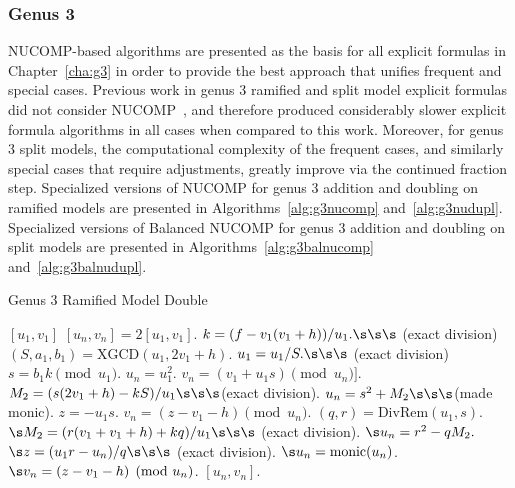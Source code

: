 \newpage


\subsubsection{Genus 3}
NUCOMP-based algorithms are presented as the basis for all explicit formulas in
Chapter~\ref{cha:g3} in order to provide the best approach that unifies frequent
and special cases. Previous work in genus 3 ramified and split model explicit
formulas did not consider
NUCOMP~\cite{fan_g3_2006,rad2019jacobian,Sutherland_g3_2019}, and therefore
produced considerably slower explicit formula algorithms in all cases when
compared to this work. Moreover, for genus 3 split models, the computational
complexity of the frequent cases, and similarly special cases that require
adjustments, greatly improve via the continued fraction step. Specialized
versions of NUCOMP for genus 3 addition and doubling on ramified models are
presented in Algorithms~\ref{alg:g3nucomp} and~\ref{alg:g3nudupl}. Specialized
versions of Balanced NUCOMP for genus 3 addition and doubling on split models
are presented in Algorithms~\ref{alg:g3balnucomp} and~\ref{alg:g3balnudupl}.


\begin{algorithm}[htbp]
\caption{Genus 3 Ramified Model Double}
\label{alg:g3nudupl}
\begin{algorithmic}[1]
\Require $[u_1,v_1]$ 
\Ensure $[u_n,v_n] = 2[u_1,v_1]$.
\vspace{5pt}
\State $k = (f - v_1(v_1 + h))/u_1. \s\s\s$ (exact division)
\State $(S,a_1,b_1) = \mathrm{XGCD}(u_1,2v_1 + h)$.
    \State $u_1 = u_1/S. \s\s\s$ (exact division)
\EndIf
\State $s = b_1k \pmod{u_1}$.
    \State $u_n = u_1^2$.
    \State $v_n = (v_1 + u_1s) \pmod{u_n}]$.
    \State $M_2 = (s(2v_1 + h) - kS)/u_1 \s\s\s $(exact division).
    \State $u_n = s^2 + M_2 \s\s\s$(made monic).
    \State $z = -u_1s$.
    \State $v_n = (z - v_1 - h) \pmod{u_n}$.
\Else \hspace{2pt} 
    \State $(q,r) = \mathrm{DivRem}(u_1,s)$.
    \State $\s M_2 = (r(v_1 + v_1 + h) + kq)/u_1 \s\s\s$ (exact division).
    \State $\s u_n = r^2 - qM_2.$
    \State $\s z = (u_1r - u_n)/q \s\s\s$ (exact division).
    \State $\s u_n = \mathrm{monic}(u_n)$.
    \State $\s v_n = (z - v_1 - h) \pmod{u_n}$.
\EndIf
\State \Return $[u_n,v_n]$.
\end{algorithmic}
\end{algorithm}


